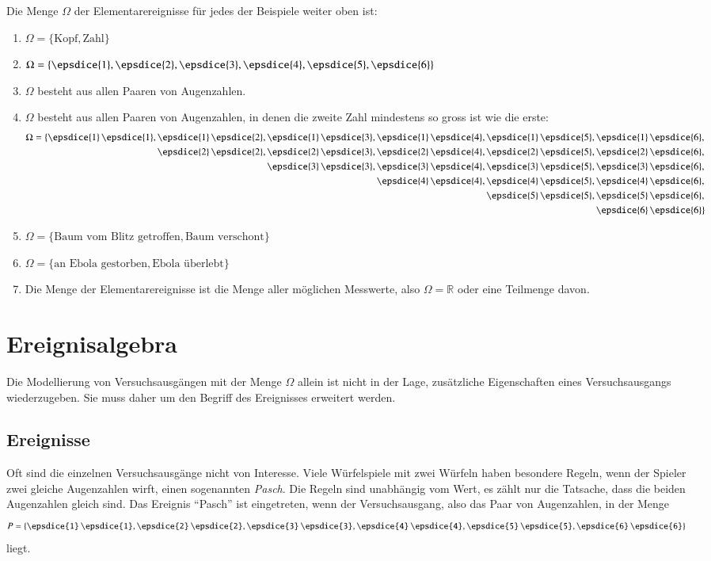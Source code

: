 Die Menge $\Omega$ der Elementarereignisse für jedes der Beispiele weiter
oben ist:
\begin{enumerate}
\item $\Omega=\{\text{Kopf},\text{Zahl}\}$
\item $\Omega=\{\epsdice{1},
\epsdice{2},
\epsdice{3},
\epsdice{4},
\epsdice{5},
\epsdice{6}\}$
\item $\Omega$ besteht aus allen Paaren von Augenzahlen.
\item $\Omega$ besteht aus allen Paaren von Augenzahlen, in denen die
zweite Zahl mindestens so gross ist wie die erste:
{
\def\e#1#2{\epsdice{#1}\,\epsdice{#2}}
\def\p{\phantom{\epsdice{1}\,\epsdice{1},\,}}
\begin{align*}
\Omega=\{
           &\e{1}{1},\e{1}{2},\e{1}{3},\e{1}{4},\e{1}{5},\e{1}{6},\\
           &\p       \e{2}{2},\e{2}{3},\e{2}{4},\e{2}{5},\e{2}{6},\\
           &\p       \p       \e{3}{3},\e{3}{4},\e{3}{5},\e{3}{6},\\
           &\p       \p       \p       \e{4}{4},\e{4}{5},\e{4}{6},\\
           &\p       \p       \p       \p       \e{5}{5},\e{5}{6},\\
           &\p       \p       \p       \p       \p       \e{6}{6}
\}
\end{align*}
}
\item $\Omega=\{\text{Baum vom Blitz getroffen},\text{Baum verschont}\}$
\item $\Omega=\{\text{an Ebola gestorben},\text{Ebola überlebt}\}$
\item Die Menge der Elementarereignisse ist die Menge aller möglichen
Messwerte, also $\Omega=\mathbb{R}$ oder eine Teilmenge davon.
\end{enumerate}

\section{Ereignisalgebra} \label{section-ereignisse}
Die Modellierung von Versuchsausgängen mit der Menge $\Omega$
allein ist nicht in der Lage, zusätzliche Eigenschaften eines
Versuchsausgangs wiederzugeben.
Sie muss daher um den Begriff des Ereignisses erweitert werden.

\subsection{Ereignisse}
Oft sind die einzelnen Versuchsausgänge nicht von Interesse.
Viele Würfelspiele mit zwei Würfeln haben besondere Regeln, wenn
der Spieler zwei gleiche Augenzahlen wirft, einen sogenannten {\em Pasch}.
Die Regeln sind unabhängig vom Wert, es zählt nur die Tatsache,
dass die beiden Augenzahlen gleich sind.
Das Ereignis ``Pasch'' ist eingetreten, wenn der Versuchsausgang, also das
Paar von Augenzahlen, in der Menge
\[
\def\e#1{\epsdice{#1}\,\epsdice{#1}}
P=\{
\e{1},
\e{2},
\e{3},
\e{4},
\e{5},
\e{6}
\}
\]
liegt.


